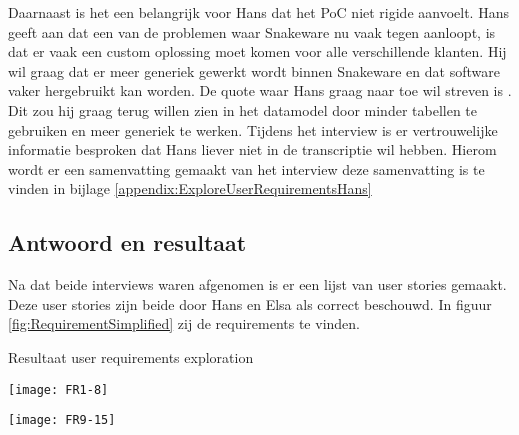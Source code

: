 \whitespace
Daarnaast is het een belangrijk voor Hans dat het PoC niet rigide aanvoelt.
Hans geeft aan dat een van de problemen waar Snakeware nu vaak tegen aanloopt, is dat er vaak een custom oplossing moet komen voor alle verschillende klanten.
Hij wil graag dat er meer generiek gewerkt wordt binnen Snakeware en dat software vaker hergebruikt kan worden. 
De quote waar Hans graag naar toe wil streven is .
Dit zou hij graag terug willen zien in het datamodel door minder tabellen te gebruiken en meer generiek te werken.
Tijdens het interview is er vertrouwelijke informatie besproken dat Hans liever niet in de transcriptie wil hebben.
Hierom wordt er een samenvatting gemaakt van het interview deze samenvatting is te vinden in bijlage \ref{appendix:ExploreUserRequirementsHans}

\subsection{Antwoord en resultaat}
Na dat beide interviews waren afgenomen is er een lijst van user stories gemaakt.
Deze user stories zijn beide door Hans en Elsa als correct beschouwd.
In figuur \ref{fig:RequirementSimplified} zij de requirements te vinden.

\begin{graphic}
    \captionsetup{type=figure}
    \caption{Resultaat user requirements exploration}
    \texttt{[image: FR1-8]}

    \whitespace
    \texttt{[image: FR9-15]}
    \label{fig:RequirementSimplified}
\end{graphic}
